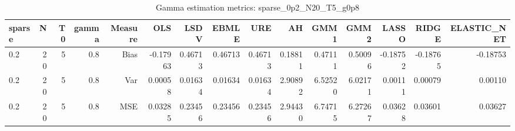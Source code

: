 \begin{table}[!htbp]\centering
\caption{Gamma estimation metrics: sparse_0p2_N20_T5_g0p8}
\label{tab:table1_sparse_0p2_N20_T5_g0p8}
\begin{tabular}{lrrrrrrrrrrrrrr}
\hline
sparse & N & T0 & gamma & Measure & OLS & LSDV & EBMLE & URE & AH & GMM1 & GMM2 & LASSO & RIDGE & ELASTIC_NET \\
\hline
0.2 & 20 & 5 & 0.8 & Bias & -0.17963 & 0.46713 & 0.46713 & 0.46713 & 0.18811 & 0.47111 & 0.50096 & -0.18752 & -0.18765 & -0.18753 \\
0.2 & 20 & 5 & 0.8 & Var & 0.00058 & 0.01634 & 0.01634 & 0.01634 & 2.90892 & 6.52520 & 6.02171 & 0.00111 & 0.00079 & 0.00110 \\
0.2 & 20 & 5 & 0.8 & MSE & 0.03285 & 0.23456 & 0.23456 & 0.23456 & 2.94430 & 6.74715 & 6.27267 & 0.03628 & 0.03601 & 0.03627 \\
\hline
\end{tabular}
\end{table}

